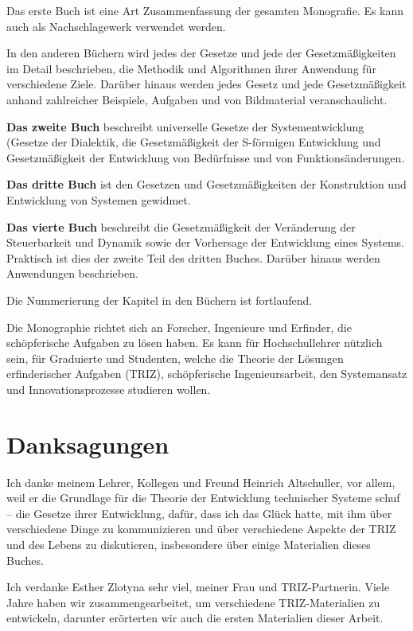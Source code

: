 \documentclass[11pt,a4paper]{article}
\begin{document}
Das erste Buch ist eine Art Zusammenfassung der gesamten Monografie. Es kann
auch als Nachschlagewerk verwendet werden.

In den anderen Büchern wird jedes der Gesetze und jede der Gesetzmäßigkeiten
im Detail beschrieben, die Methodik und Algorithmen ihrer Anwendung für
verschiedene Ziele. Darüber hinaus werden jedes Gesetz und jede
Gesetzmäßigkeit anhand zahlreicher Beispiele, Aufgaben und von Bildmaterial
veranschaulicht.

\textbf{Das zweite Buch} beschreibt universelle Gesetze der Systementwicklung
(Gesetze der Dialektik, die Gesetzmäßigkeit der S-förmigen Entwicklung und
Gesetzmäßigkeit der Entwicklung von Bedürfnisse und von Funktionsänderungen.

\textbf{Das dritte Buch} ist den Gesetzen und Gesetzmäßigkeiten der
Konstruktion und Entwicklung von Systemen gewidmet.

\textbf{Das vierte Buch} beschreibt die Gesetzmäßigkeit der Veränderung der
Steuerbarkeit und Dynamik sowie der Vorhersage der Entwicklung eines Systems.
Praktisch ist dies der zweite Teil des dritten Buches. Darüber hinaus werden
Anwendungen beschrieben.

Die Nummerierung der Kapitel in den Büchern ist fortlaufend.

Die Monographie richtet sich an Forscher, Ingenieure und Erfinder, die
schöpferische Aufgaben zu lösen haben. Es kann für Hochschullehrer nützlich
sein, für Graduierte und Studenten, welche die Theorie der Lösungen
erfinderischer Aufgaben (TRIZ), schöpferische Ingenieursarbeit, den
Systemansatz und Innovationsprozesse studieren wollen.

\section*{Danksagungen}

Ich danke meinem Lehrer, Kollegen und Freund Heinrich Altschuller, vor allem,
weil er die Grundlage für die Theorie der Entwicklung technischer Systeme
schuf -- die Gesetze ihrer Entwicklung, dafür, dass ich das Glück hatte, mit
ihm über verschiedene Dinge zu kommunizieren und über verschiedene Aspekte der
TRIZ und des Lebens zu diskutieren, insbesondere über einige Materialien
dieses Buches.

Ich verdanke Esther Zlotyna sehr viel, meiner Frau und TRIZ-Partnerin.  Viele
Jahre haben wir zusammengearbeitet, um verschiedene TRIZ-Materialien zu
entwickeln, darunter erörterten wir auch die ersten Materialien dieser Arbeit.
\end{document}
